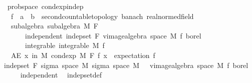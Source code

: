 \begin{isabellebody}
\ {\isacharparenleft}{\kern0pt}\ prob{\isacharunderscore}{\kern0pt}space{\isacharparenright}{\kern0pt}\ cond{\isacharunderscore}{\kern0pt}exp{\isacharunderscore}{\kern0pt}indep{\isacharcolon}{\kern0pt}\isanewline
\ \ \ f\ {\isacharcolon}{\kern0pt}{\isacharcolon}{\kern0pt}\ {\isachardoublequoteopen}{\isacharprime}{\kern0pt}a\ {\isasymRightarrow}\ {\isacharprime}{\kern0pt}b\ {\isacharcolon}{\kern0pt}{\isacharcolon}{\kern0pt}\ {\isacharbraceleft}{\kern0pt}second{\isacharunderscore}{\kern0pt}countable{\isacharunderscore}{\kern0pt}topology{\isacharcomma}{\kern0pt}\ banach{\isacharcomma}{\kern0pt}\ real{\isacharunderscore}{\kern0pt}normed{\isacharunderscore}{\kern0pt}field{\isacharbraceright}{\kern0pt}{\isachardoublequoteclose}\isanewline
\ \ \ subalgebra{\isacharcolon}{\kern0pt}\ {\isachardoublequoteopen}subalgebra\ M\ F{\isachardoublequoteclose}\isanewline
\ \ \ \ \ \ \ independent{\isacharcolon}{\kern0pt}\ {\isachardoublequoteopen}indep{\isacharunderscore}{\kern0pt}set\ F\ {\isacharparenleft}{\kern0pt}vimage{\isacharunderscore}{\kern0pt}algebra\ {\isacharparenleft}{\kern0pt}space\ M{\isacharparenright}{\kern0pt}\ f\ borel{\isacharparenright}{\kern0pt}{\isachardoublequoteclose}\isanewline
\ \ \ \ \ \ \ integrable{\isacharcolon}{\kern0pt}\ {\isachardoublequoteopen}integrable\ M\ f{\isachardoublequoteclose}\isanewline
\ \ \ {\isachardoublequoteopen}AE\ x\ in\ M{\isachardot}{\kern0pt}\ cond{\isacharunderscore}{\kern0pt}exp\ M\ F\ f\ x\ {\isacharequal}{\kern0pt}\ expectation\ f{\isachardoublequoteclose}\isanewline
%
\isadelimproof
%
\endisadelimproof
%
\isatagproof
{}\isamarkupfalse%
\ {\isacharminus}{\kern0pt}\isanewline
\ \ \isamarkupfalse%
\ {\isachardoublequoteopen}indep{\isacharunderscore}{\kern0pt}set\ F\ {\isacharparenleft}{\kern0pt}sigma\ {\isacharparenleft}{\kern0pt}space\ M{\isacharparenright}{\kern0pt}\ {\isacharparenleft}{\kern0pt}sigma\ {\isacharparenleft}{\kern0pt}space\ M{\isacharparenright}{\kern0pt}\ {\isacharbraceleft}{\kern0pt}{\isacharbraceright}{\kern0pt}\ {\isasymunion}\ {\isacharparenleft}{\kern0pt}vimage{\isacharunderscore}{\kern0pt}algebra\ {\isacharparenleft}{\kern0pt}space\ M{\isacharparenright}{\kern0pt}\ f\ borel{\isacharparenright}{\kern0pt}{\isacharparenright}{\kern0pt}{\isacharparenright}{\kern0pt}{\isachardoublequoteclose}\isanewline
\ \ \ \ \isamarkupfalse%
\ independent\ \isamarkupfalse%
\ indep{\isacharunderscore}{\kern0pt}set{\isacharunderscore}{\kern0pt}def\ \isanewline

\end{isabellebody}
